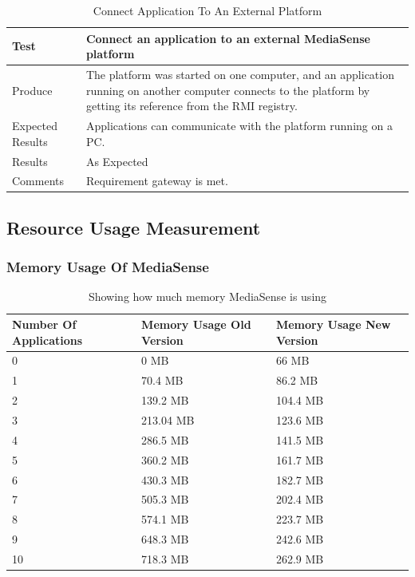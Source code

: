 \begin{table}[!h]
    \begin{tabular}{ | l | p{12cm} |}
    \hline
    Test 	 				& 		 Connect an application to an external MediaSense platform\\ \hline
	Produce  				& 		 The platform was started on one computer, and an application running on another computer connects to the platform by getting its reference from the RMI registry.\\ \hline
	Expected Results  		& 		 Applications can communicate with the platform running on a PC. \\ \hline
	Results 				& 		 As Expected\\ \hline
	Comments				& 		 Requirement gateway is met. \\ \hline
    \end{tabular}
    \caption{Connect Application To An External Platform}
\end{table}
\clearpage


\subsection{Resource Usage Measurement}

\subsubsection{Memory Usage Of MediaSense}
\begin{table}[H]
\begin{center}
    \begin{tabular}[t!]{ | l | l | l |}
    \hline
    Number Of Applications								& Memory Usage Old Version				& Memory Usage New Version\\ \hline
    0 													& 0 MB									& 66 MB\\ \hline
    1 													& 70.4 MB								& 86.2 MB\\ \hline
    2 													& 139.2 MB								& 104.4 MB\\ \hline
    3 													& 213.04 MB								& 123.6 MB\\ \hline
    4 													& 286.5 MB								& 141.5 MB\\ \hline
    5 													& 360.2 MB								& 161.7 MB\\ \hline
    6 													& 430.3 MB								& 182.7 MB\\ \hline
    7 													& 505.3 MB								& 202.4 MB\\ \hline
    8 													& 574.1 MB								& 223.7 MB\\ \hline
    9 													& 648.3 MB								& 242.6 MB\\ \hline
    10 													& 718.3 MB								& 262.9 MB\\ \hline
    \end{tabular}
    \caption{Showing how much memory MediaSense is using}
\end{center}
\end{table}


